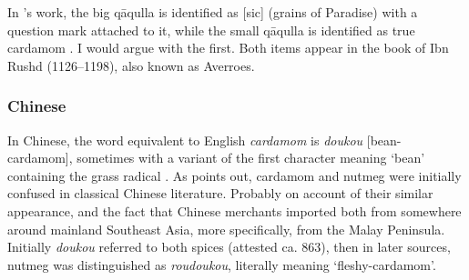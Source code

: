 In \textcite[66-68]{amar_arabian_2017}'s work, the big q\={a}qulla is identified as  [sic] (grains of Paradise) with a question mark attached to it, while the small q\={a}qulla is identified as true cardamom . I would argue with the first. Both items appear in the book of Ibn Rushd (1126--1198), also known as Averroes.




\subsubsection{Chinese}



In Chinese, the word equivalent to English \textit{cardamom} is  \textit{doukou} [bean-cardamom], sometimes with a variant of the first character meaning `bean' containing the grass radical . As \textcite[22]{donkin_between_2003} points out, cardamom and nutmeg were initially confused in classical Chinese literature. Probably on account of their similar appearance, and the fact that Chinese merchants imported both from somewhere around mainland Southeast Asia, more specifically, from the Malay Peninsula. Initially \textit{doukou} referred to both spices (attested ca. 863), then in later sources, nutmeg was distinguished as  \textit{roudoukou}, literally meaning `fleshy-cardamom'. 

